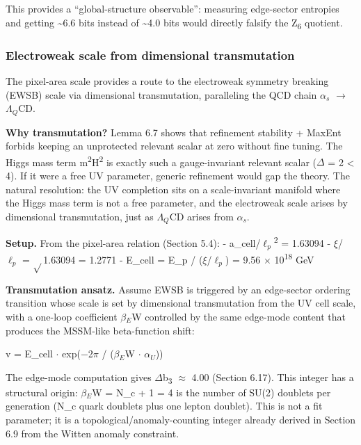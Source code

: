 \documentclass[11pt,a4paper]{article}
\theoremstyle{remark}
\begin{document}
This provides a ``global-structure observable'': measuring edge-sector
entropies and getting \textasciitilde6.6 bits instead of \textasciitilde4.0 bits would
directly falsify the Z\textsubscript{6} quotient.

\subsubsection{Electroweak scale from dimensional transmutation}\label{electroweak-scale-from-dimensional-transmutation}

The pixel-area scale provides a route to the electroweak symmetry breaking
(EWSB) scale via dimensional transmutation, paralleling the QCD chain
\(\alpha_s\) \ensuremath{\to} \(\Lambda{}_Q\)CD.

\textbf{Why transmutation?} Lemma 6.7 shows that refinement stability + MaxEnt forbids
keeping an unprotected relevant scalar at zero without fine tuning. The Higgs
mass term m\textsuperscript{2}\textbar H\textbar{}\textsuperscript{2} is exactly such a gauge-invariant relevant scalar (\ensuremath{\Delta} = 2 \textless{} 4).
If it were a free UV parameter, generic refinement would gap the theory.
The natural resolution: the UV completion sits on a scale-invariant manifold
where the Higgs mass term is not a free parameter, and the electroweak scale
arises by dimensional transmutation, just as \(\Lambda{}_Q\)CD arises from \(\alpha_s\).

\textbf{Setup.} From the pixel-area relation (Section 5.4):
- a\_cell/\(\ell_p\)\textsuperscript{2} = 1.63094
- \ensuremath{\xi}/\(\ell_p\) = \ensuremath{\sqrt{}}1.63094 = 1.2771
- E\_cell = E\_p / (\ensuremath{\xi}/\(\ell_p\)) = 9.56 \ensuremath{\times} 10\textsuperscript{18} GeV

\textbf{Transmutation ansatz.} Assume EWSB is triggered by an edge-sector ordering transition whose scale is set by dimensional transmutation from the UV cell scale, with a one-loop coefficient \(\beta{}_E\)W controlled by the same edge-mode content that produces the MSSM-like beta-function shift:

v = E\_cell \ensuremath{\cdot} exp(\ensuremath{-}2\ensuremath{\pi} / (\(\beta{}_E\)W \ensuremath{\cdot} \(\alpha_U\)))

The edge-mode computation gives \ensuremath{\Delta}b\textsubscript{3} \ensuremath{\approx} 4.00 (Section 6.17). This integer has a structural origin: \(\beta{}_E\)W = N\_c + 1 = 4 is the number of SU(2) doublets per generation (N\_c quark doublets plus one lepton doublet). This is not a fit parameter; it is a topological/anomaly-counting integer already derived in Section 6.9 from the Witten anomaly constraint.
\end{document}
